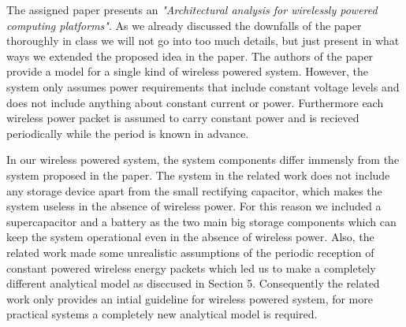 The assigned paper \cite{paper} presents an \emph{"Architectural analysis for wirelessly powered computing platforms"}. As we already discussed the downfalls of the paper thoroughly in class we will not go into too much details, but  just present in what ways we extended the proposed idea in the paper. The authors of the paper provide a model for a single kind of wireless powered system. However, the system only assumes power requirements that include constant voltage levels and does not include anything about constant current or power. Furthermore each wireless power packet is assumed to carry constant power and is recieved periodically while the period is known in advance. 

In our wireless powered system, the system components differ immensly from the system proposed in the paper. The system in the related work does not include any storage device apart from the small rectifying capacitor, which makes the system useless in the absence of wireless power. For this reason we included a supercapacitor and a battery as the two main big storage components which can keep the system operational even in the absence of wireless power. Also, the related work made some unrealistic assumptions of the periodic reception of constant powered wireless energy packets which led us to make a completely different analytical model as disccused in Section 5. Consequently the related work only provides an intial guideline for wireless powered system, for more practical systems a completely new analytical model is required.      
 